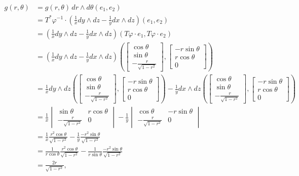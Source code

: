 \begin{align*}
g(r,\theta)&=g(r,\theta)\,dr\wedge d\theta(e_1,e_2)\\
&=T^*\varphi^{-1}\cdot\left(\frac{1}{x}dy\wedge dz-\frac{1}{y}dx\wedge dz\right)(e_1,e_2)\\
&=\left(\frac{1}{x}dy\wedge dz-\frac{1}{y}dx\wedge dz\right)(T\varphi\cdot e_1,T\varphi\cdot e_2)\\
&=\left(\frac{1}{x}dy\wedge dz-\frac{1}{y}dx\wedge dz\right)\left(\begin{bmatrix}\cos\theta\\\sin\theta\\-\frac{r}{\sqrt{1-r^2}}\end{bmatrix},\begin{bmatrix}-r\sin\theta\\r\cos\theta\\0\end{bmatrix}\right)\\
&=\frac{1}{x}dy\wedge dz\left(\begin{bmatrix}\cos\theta\\\sin\theta\\-\frac{r}{\sqrt{1-r^2}}\end{bmatrix},\begin{bmatrix}-r\sin\theta\\r\cos\theta\\0\end{bmatrix}\right)-\frac{1}{y}dx\wedge dz\left(\begin{bmatrix}\cos\theta\\\sin\theta\\-\frac{r}{\sqrt{1-r^2}}\end{bmatrix},\begin{bmatrix}-r\sin\theta\\r\cos\theta\\0\end{bmatrix}\right)\\
&=\frac{1}{x}\begin{vmatrix}\sin\theta&r\cos\theta\\-\frac{r}{\sqrt{1-r^2}}&0\end{vmatrix}-\frac{1}{y}\begin{vmatrix}\cos\theta&-r\sin\theta\\-\frac{r}{\sqrt{1-r^2}}&0\end{vmatrix}\\
&=\frac{1}{x}\frac{r^2\cos\theta}{\sqrt{1-r^2}}-\frac{1}{y}\frac{-r^2\sin\theta}{\sqrt{1-r^2}}\\
&=\frac{1}{r\cos\theta}\frac{r^2\cos\theta}{\sqrt{1-r^2}}-\frac{1}{r\sin\theta}\frac{-r^2\sin\theta}{\sqrt{1-r^2}}\\
&=\frac{2r}{\sqrt{1-r^2}},
\end{align*}
